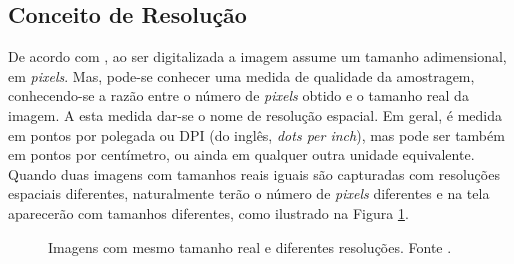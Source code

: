 \subsection{Conceito de Resolução} 
\label{resolucao}


De acordo com \cite{scuri1999fundamentos}, ao ser digitalizada a imagem assume um tamanho adimensional, em \textit{pixels}. Mas, pode-se conhecer uma medida de qualidade da amostragem, conhecendo-se a razão entre o número de \textit{pixels} obtido e o tamanho real da imagem. A esta medida dar-se o nome de resolução espacial. Em geral, é medida em pontos por polegada ou DPI (do inglês, \textit{dots per inch}), mas pode ser também em pontos por centímetro, ou ainda em qualquer outra unidade equivalente. Quando duas imagens com tamanhos reais iguais são capturadas com resoluções espaciais diferentes, naturalmente terão o número de \textit{pixels} diferentes e na tela aparecerão com tamanhos diferentes, como ilustrado na Figura \ref{fig:res1}.

\begin{figure}[h]
    \centering
    \qquad
    \caption{Imagens com mesmo tamanho real e diferentes resoluções. Fonte \cite{scuri1999fundamentos}.}%
	    \label{fig:res1}
\end{figure}

